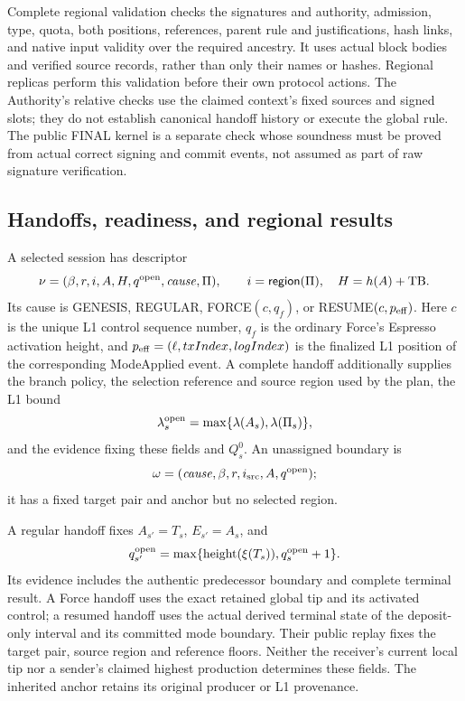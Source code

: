 Complete regional validation checks the signatures and authority,
admission, type, quota, both positions, references, parent rule and
justifications, hash links, and native input validity over the required
ancestry. It uses actual block bodies and verified source records,
rather than only their names or hashes. Regional replicas perform this
validation before their own protocol actions. The Authority's relative
checks use the claimed context's fixed sources and signed slots; they
do not establish canonical handoff history or execute the global rule.
The public FINAL kernel is a separate check whose soundness must be
proved from actual correct signing and commit events, not assumed as
part of raw signature verification.

\subsection{Handoffs, readiness, and regional results}
\label{sec:objects-handoffs}

\begin{definition}
\label{def:handoff}
A selected session has descriptor
\[
 \nu=(\beta,r,i,A,H,q^{\rm open},\mathit{cause},\Pi),
 \qquad i=\mathsf{region}(\Pi),\quad H=h(A)+\mathrm{TB}.
\]
Its cause is GENESIS, REGULAR, FORCE$(c,q_f)$, or
RESUME$(c,p_{\rm eff})$. Here $c$ is the unique L1 control sequence
number, $q_f$ is the ordinary Force's Espresso activation height, and
$p_{\rm eff}=(\ell,txIndex,logIndex)$ is the finalized L1 position of
the corresponding ModeApplied event. A complete handoff additionally supplies the
branch policy, the selection reference and source region used by the
plan, the L1 bound
\[
 \lambda_s^{\rm open}=\max\{\lambda(A_s),\lambda(\Pi_s)\},
\]
and the evidence fixing these fields and $Q_s^0$.
An unassigned boundary is
\[
 \omega=(\mathit{cause},\beta,r,i_{\rm src},A,q^{\rm open});
\]
it has a fixed target pair and anchor but no selected region.
\end{definition}
A regular handoff fixes $A_{s'}=T_s$, $E_{s'}=A_s$, and
\begin{equation}
\label{eq:regular-reference-floor}
 q_{s'}^{\rm open}=
 \max\{\operatorname{height}(\xi(T_s)),q_s^{\rm open}+1\}.
\end{equation}
Its evidence includes the authentic predecessor boundary and complete
terminal result. A Force handoff uses the exact retained global tip
and its activated control; a resumed handoff uses the actual derived
terminal state of the deposit-only interval and its committed mode
boundary. Their public replay fixes the target pair, source region and
reference floors. Neither the receiver's current local tip nor a
sender's claimed highest production determines these fields. The
inherited anchor retains its original producer or L1 provenance.


